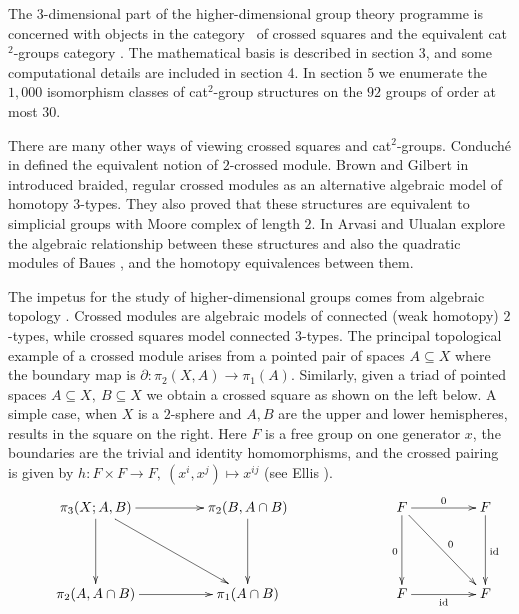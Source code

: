 \documentclass[a4paper,11pt]{article}
\theoremstyle{plain}
\theoremstyle{definition}
\begin{document}
The $3$-dimensional part of the higher-dimensional group theory programme 
is concerned with objects in the category \catXSq\ of crossed squares 
and the equivalent cat$^2$-groups category \catCatt. 
The mathematical basis is described in section 3, 
and some computational details are included in section 4. 
In section 5 we enumerate the $1,000$ isomorphism 
classes of cat$^2$-group structures on the $92$ groups of order at most $30$. 

There are many other ways of viewing crossed squares and cat$^2$-groups. 
Conduch\'{e} in \cite{conduche} defined the equivalent notion of 
$2$-crossed module.
Brown and Gilbert in \cite{brown-gilbert} introduced braided, 
regular crossed modules as an alternative algebraic model of homotopy $3$-types. 
They also proved that these structures are equivalent to simplicial groups 
with Moore complex of length $2$. 
In \cite{arvasi-ulualan} Arvasi and Ulualan explore the algebraic relationship 
between these structures and also the quadratic modules of Baues \cite{baues}, 
and the homotopy equivalences between them. 

The impetus for the study of higher-dimensional groups 
comes from algebraic topology \cite{brown-indag}. 
Crossed modules are algebraic models of connected (weak homotopy) $2$-types, 
while crossed squares model connected $3$-types. 
The principal topological example of a crossed module arises from 
a pointed pair of spaces $ A \subseteq X$ where the boundary map is 
$\partial : \pi_2(X,A) \to \pi_1(A)$. 
Similarly, given a triad of pointed spaces $A \subseteq X,\ B \subseteq X$ 
we obtain a crossed square as shown on the left below. 
A simple case, when $X$ is a $2$-sphere and $A,B$ are the 
upper and lower hemispheres, results in the square on the right. 
Here $F$ is a free group on one generator $x$, 
the boundaries are the trivial and identity homomorphisms, 
and the crossed pairing is given by 
$h : F \times F \to F,\ (x^i,x^j) \mapsto x^{ij}$  
(see Ellis \cite{ellis}). 
\begin{equation*} 
\xymatrix@R=20pt@C=20pt
{     &  \pi_3(X;A,B) \ar[dd] \ar[rr] \ar[ddrr] 
         &  & \pi_2(B, A \cap B) \ar[dd] 
               &  &  &  F \ar[dd]_{0} \ar[rr]^{0} \ar[ddrr]^{0} 
                        &  &  F \ar[dd]^{{\rm id}} \\
      &  &  &  &  &    \\  
      &  \pi_2(A,A \cap B) \ar[rr] 
         &  & \pi_1(A \cap B) & &  &  F \ar[rr]_{{\rm id}} 
                        &  &  F } 
\end{equation*}
\end{document}

